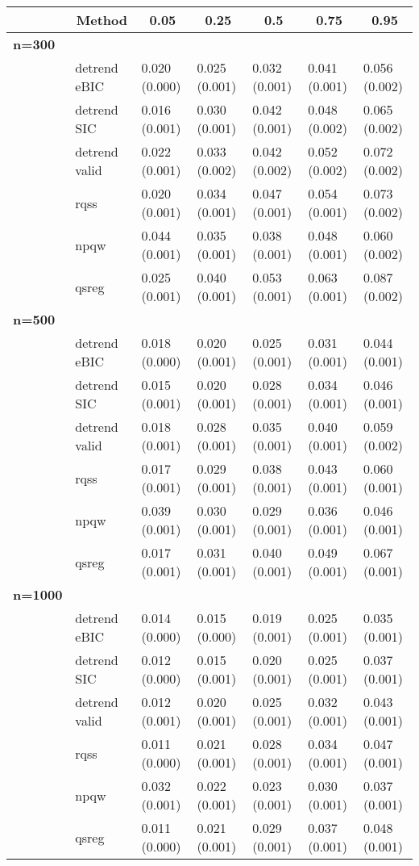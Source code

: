 \begin{table}[!tbp]
\begin{center}
\begin{tabular}{lllllll}
\hline\hline
\multicolumn{1}{l}{}&\multicolumn{1}{c}{Method}&\multicolumn{1}{c}{0.05}&\multicolumn{1}{c}{0.25}&\multicolumn{1}{c}{0.5}&\multicolumn{1}{c}{0.75}&\multicolumn{1}{c}{0.95}\tabularnewline
\hline
{\bfseries n=300}&&&&&&\tabularnewline
~~&detrend eBIC&0.020 (0.000)&0.025 (0.001)&0.032 (0.001)&0.041 (0.001)&0.056 (0.002)\tabularnewline
~~&detrend SIC&0.016 (0.001)&0.030 (0.001)&0.042 (0.001)&0.048 (0.002)&0.065 (0.002)\tabularnewline
~~&detrend valid&0.022 (0.001)&0.033 (0.002)&0.042 (0.002)&0.052 (0.002)&0.072 (0.002)\tabularnewline
~~&rqss&0.020 (0.001)&0.034 (0.001)&0.047 (0.001)&0.054 (0.001)&0.073 (0.002)\tabularnewline
~~&npqw&0.044 (0.001)&0.035 (0.001)&0.038 (0.001)&0.048 (0.001)&0.060 (0.002)\tabularnewline
~~&qsreg&0.025 (0.001)&0.040 (0.001)&0.053 (0.001)&0.063 (0.001)&0.087 (0.002)\tabularnewline
\hline
{\bfseries n=500}&&&&&&\tabularnewline
~~&detrend eBIC&0.018 (0.000)&0.020 (0.001)&0.025 (0.001)&0.031 (0.001)&0.044 (0.001)\tabularnewline
~~&detrend SIC&0.015 (0.001)&0.020 (0.001)&0.028 (0.001)&0.034 (0.001)&0.046 (0.001)\tabularnewline
~~&detrend valid&0.018 (0.001)&0.028 (0.001)&0.035 (0.001)&0.040 (0.001)&0.059 (0.002)\tabularnewline
~~&rqss&0.017 (0.001)&0.029 (0.001)&0.038 (0.001)&0.043 (0.001)&0.060 (0.001)\tabularnewline
~~&npqw&0.039 (0.001)&0.030 (0.001)&0.029 (0.001)&0.036 (0.001)&0.046 (0.001)\tabularnewline
~~&qsreg&0.017 (0.001)&0.031 (0.001)&0.040 (0.001)&0.049 (0.001)&0.067 (0.001)\tabularnewline
\hline
{\bfseries n=1000}&&&&&&\tabularnewline
~~&detrend eBIC&0.014 (0.000)&0.015 (0.000)&0.019 (0.001)&0.025 (0.001)&0.035 (0.001)\tabularnewline
~~&detrend SIC&0.012 (0.000)&0.015 (0.001)&0.020 (0.001)&0.025 (0.001)&0.037 (0.001)\tabularnewline
~~&detrend valid&0.012 (0.001)&0.020 (0.001)&0.025 (0.001)&0.032 (0.001)&0.043 (0.001)\tabularnewline
~~&rqss&0.011 (0.000)&0.021 (0.001)&0.028 (0.001)&0.034 (0.001)&0.047 (0.001)\tabularnewline
~~&npqw&0.032 (0.001)&0.022 (0.001)&0.023 (0.001)&0.030 (0.001)&0.037 (0.001)\tabularnewline
~~&qsreg&0.011 (0.000)&0.021 (0.001)&0.029 (0.001)&0.037 (0.001)&0.048 (0.001)\tabularnewline
\hline
\end{tabular}\end{center}
\end{table}
